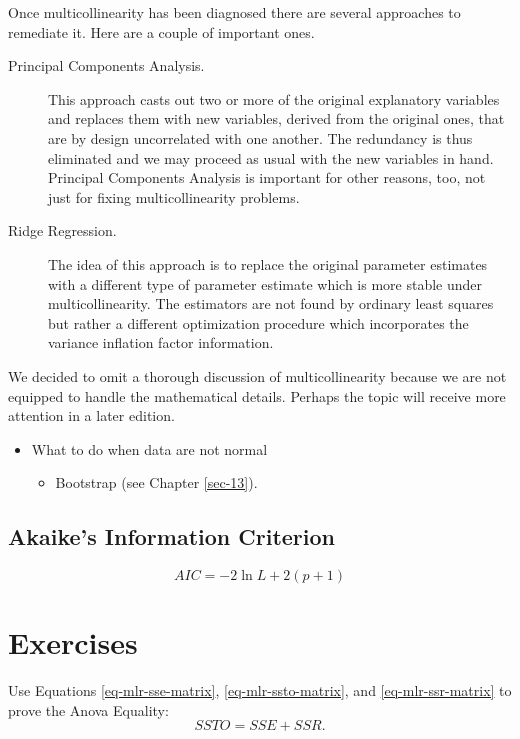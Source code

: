 Once multicollinearity has been diagnosed there are several approaches
to remediate it. Here are a couple of important ones.
\begin{description}
\item[{Principal Components Analysis.}] This approach casts out two or
more of the original explanatory variables and replaces them with
new variables, derived from the original ones, that are by design
uncorrelated with one another. The redundancy is thus eliminated
and we may proceed as usual with the new variables in
hand. Principal Components Analysis is important for other
reasons, too, not just for fixing multicollinearity problems.
\item[{Ridge Regression.}] The idea of this approach is to replace the
original parameter estimates with a different type of parameter
estimate which is more stable under multicollinearity. The
estimators are not found by ordinary least squares but rather a
different optimization procedure which incorporates the variance
inflation factor information.
\end{description}

We decided to omit a thorough discussion of multicollinearity because
we are not equipped to handle the mathematical details. Perhaps the
topic will receive more attention in a later edition.

\begin{itemize}
\item What to do when data are not normal
\begin{itemize}
\item Bootstrap (see Chapter \ref{sec-13}).
\end{itemize}
\end{itemize}

\subsection{Akaike's Information Criterion}
\label{sec-12-7-4}

\[
AIC = -2\ln L + 2(p + 1)
\]

\newpage{}

\section{Exercises}
\label{sec-12-8}

\setcounter{thm}{0}

\begin{xca}
\label{xca-anova-equality} Use Equations \eqref{eq-mlr-sse-matrix},
\eqref{eq-mlr-ssto-matrix}, and \eqref{eq-mlr-ssr-matrix} to prove the
Anova Equality: \[ SSTO = SSE + SSR.\]
\end{xca}
